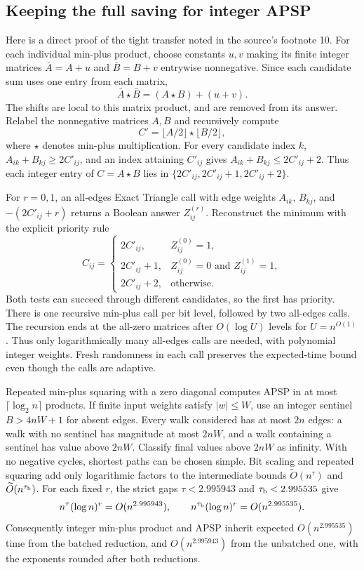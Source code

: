 \documentclass[11pt]{article}
\newcommand{\softO}{\widetilde O}
\begin{document}
\subsection*{Keeping the full saving for integer APSP}
Here is a direct proof of the tight transfer noted in the source's footnote 10.
For each individual min-plus product, choose constants $u,v$ making its
finite integer matrices $\bar A=A+u$ and $\bar B=B+v$ entrywise nonnegative.
Since each candidate sum uses one entry from each matrix,
\[
\bar A\star\bar B=(A\star B)+(u+v).
\]
The shifts are local to this matrix product, and are removed from its
answer. Relabel the nonnegative matrices $A,B$ and recursively compute
\[
C'=\lfloor A/2\rfloor\star\lfloor B/2\rfloor,
\]
where $\star$ denotes min-plus multiplication. For every candidate index
$k$, $A_{ik}+B_{kj}\ge2C'_{ij}$, and an index attaining $C'_{ij}$ gives
$A_{ik}+B_{kj}\le2C'_{ij}+2$. Thus each integer entry of $C=A\star B$ lies
in $\{2C'_{ij},2C'_{ij}+1,2C'_{ij}+2\}$.

For $r=0,1$, an all-edges Exact Triangle call with edge weights $A_{ik}$,
$B_{kj}$, and $-(2C'_{ij}+r)$ returns a Boolean answer $Z^{(r)}_{ij}$.
Reconstruct the minimum with the explicit priority rule
\[
C_{ij}=\begin{cases}
2C'_{ij},&Z^{(0)}_{ij}=1,\\
2C'_{ij}+1,&Z^{(0)}_{ij}=0\text{ and }Z^{(1)}_{ij}=1,\\
2C'_{ij}+2,&\text{otherwise}.
\end{cases}
\]
Both tests can succeed through different candidates, so the first has
priority. There is one recursive min-plus call per bit level, followed by
two all-edges calls. The recursion ends at the all-zero matrices after
$O(\log U)$ levels for $U=n^{O(1)}$.
Thus only logarithmically many all-edges calls are needed, with polynomial
integer weights. Fresh randomness in each call preserves the expected-time
bound even though the calls are adaptive.

Repeated min-plus squaring with a zero diagonal computes APSP in at most
$\lceil\log_2 n\rceil$ products. If finite input weights satisfy $|w|\le W$, use an
integer sentinel $B>4nW+1$ for absent edges. Every walk considered has at
most $2n$ edges: a walk with no sentinel has magnitude at most $2nW$, and
a walk containing a sentinel has value above $2nW$. Classify final values
above $2nW$ as infinity. With no negative cycles, shortest paths can be
chosen simple. Bit scaling and repeated squaring add only logarithmic
factors to the intermediate bounds $\softO(n^\tau)$ and
$\softO(n^{\tau_{\rm b}})$. For each fixed $r$, the strict gaps
$\tau<2.995943$ and $\tau_{\rm b}<2.995535$ give
\[
n^\tau(\log n)^r=O(n^{2.995943}),\qquad
n^{\tau_{\rm b}}(\log n)^r=O(n^{2.995535}).
\]
Consequently integer min-plus product and APSP inherit expected
$O(n^{2.995535})$ time from the batched reduction, and $O(n^{2.995943})$
from the unbatched one, with the exponents rounded after both reductions.
\end{document}
